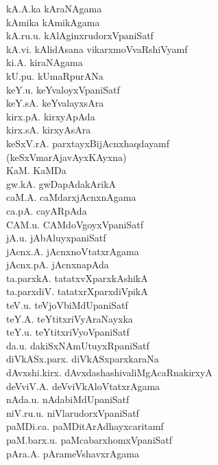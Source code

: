 {\begin{multicols}{2}
\begin{tabbing}
kA.A.ka \> kAraNAgama\\[2pt]
kAmika \> kAmikAgama\\[2pt]
kA.ru.u. \> kAlAginxrudorxVpaniSatf\\[2pt]
kA.vi. \> kAlidAsana vikarxmoVvaRshiVyamf\\[2pt]
ki.A. \> kiraNAgama\\[2pt]
kU.pu. \> kUmaRpurANa\\[2pt]
keY.u. \> keYvaloyxVpaniSatf\\[2pt]
keY.sA. \> keYvalayxsAra\\[2pt]
kirx.pA. \> kirxyApAda\\[2pt]
kirx.sA. \> kirxyAsAra\\[2pt]
keSxV.rA. \> parxtayxBijAcnxhaqdayamf\\[2pt]
(keSxVmarAjavAyxKAyxna) \> \\[2pt]
KaM. \> KaMDa\\[2pt]
gw.kA. \> gwDapAdakArikA\\[2pt]
caM.A. \> caMdarxjAcnxnAgama\\[2pt]
ca.pA. \> cayARpAda\\[2pt]
CAM.u. \> CAMdoVgoyxVpaniSatf\\[2pt]
jA.u. \> jAbAluyxpaniSatf\\[2pt]
jAcnx.A. \> jAcnxnoVtatxrAgama\\[2pt]
jAcnx.pA. \> jAcnxnapAda\\[2pt]
ta.parxkA. \> tatatxvXparxkAshikA\\[2pt]
ta.parxdiV. \> tatatxrXparxdiVpikA\\[2pt]
teV.u. \> teVjoVbiMdUpaniSatf\\[2pt]
teY.A. \> teYtitxriVyAraNayxka\\[2pt]
teY.u. \> teYtitxriVyoVpaniSatf\\[2pt]
da.u. \> dakiSxNAmUtuyxRpaniSatf\\[2pt]
diVkASx.parx. \> diVkASxparxkaraNa\\[2pt]
dAvxshi.kirx. \> dAvxdashashivaliMgAcaRnakirxyA\\[2pt]
deVviV.A. \> deVviVkAloVtatxrAgama\\[2pt]
nAda.u. \> nAdabiMdUpaniSatf\\[2pt]
niV.ru.u. \> niVlarudorxVpaniSatf\\[2pt]
paMDi.ca. \> paMDitArAdhayxcaritamf\\[2pt]
paM.barx.u. \> paMcabarxhomxVpaniSatf\\[2pt]
pAra.A. \> pArameVshavxrAgama\\[2pt]

\end{tabbing}
\end{multicols}}
